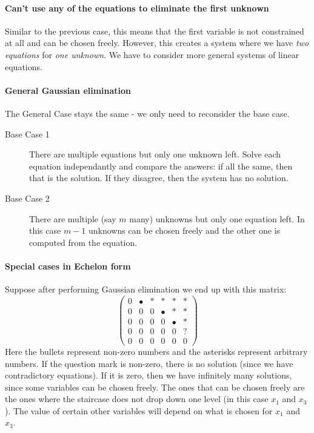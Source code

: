 \documentclass{article}
\begin{document}
\paragraph{Can't use any of the equations to eliminate the first unknown}
Similar to the previous case, this means that the first variable is not constrained at all and can be chosen freely. However, this creates a system where we have \textit{two equations} for \textit{one unknown}. We have to consider more general systems of linear equations.

\paragraph{General Gaussian elimination}
The General Case stays the same - we only need to reconsider the base case.
\begin{description}
\item [Base Case 1] There are multiple equations but only one unknown left. Solve each equation independantly and compare the answers: if all the same, then that is the solution. If they disagree, then the system has no solution.
\item [Base Case 2] There are multiple (say $m$ many) unknowns but only one equation left. In this case $m-1$ unknowns can be chosen freely and the other one is computed from the equation.
\end{description}

\paragraph{Special cases in Echelon form}
Suppose after performing Gaussian elimination we end up with this matrix:
$$\begin{pmatrix}
  0 & \bullet & * & * & * & * \\
  0 & 0 & 0 & \bullet & * & * \\
  0 & 0 & 0 & 0 & \bullet & * \\
  0 & 0 & 0 & 0 & 0 & ? \\
  0 & 0 & 0 & 0 & 0 & 0
\end{pmatrix}$$
Here the bullets represent non-zero numbers and the asterisks represent arbitrary numbers. If the question mark is non-zero, there is no solution (since we have contradictory equations). If it is zero, then we have infinitely many solutions, since some variables can be chosen freely. The ones that can be chosen freely are the ones where the staircase does not drop down one level (in this case $x_1$ and $x_3$). The value of certain other variables will depend on what is chosen for $x_1$ and $x_3$.
\end{document}
